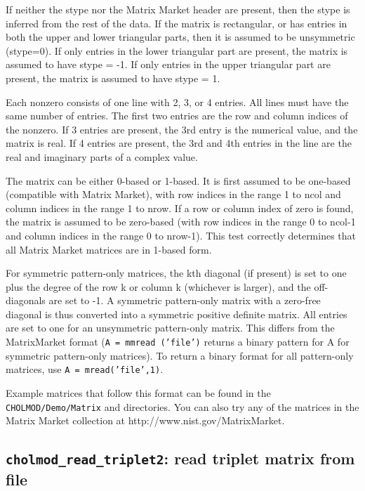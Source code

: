 \documentclass[11pt]{article}
\begin{document}
If neither the stype nor the Matrix Market header are present, then the stype
is inferred from the rest of the data.  If the matrix is rectangular, or has
entries in both the upper and lower triangular parts, then it is assumed to be
unsymmetric (stype=0).  If only entries in the lower triangular part are
present, the matrix is assumed to have stype = -1.  If only entries in the
upper triangular part are present, the matrix is assumed to have stype = 1.

Each nonzero consists of one line with 2, 3, or 4 entries.  All lines must have
the same number of entries.  The first two entries are the row and column
indices of the nonzero.  If 3 entries are present, the 3rd entry is the
numerical value, and the matrix is real.  If 4 entries are present, the 3rd and
4th entries in the line are the real and imaginary parts of a complex value.

The matrix can be either 0-based or 1-based.  It is first assumed to be
one-based (compatible with Matrix Market), with row indices in the range 1 to
ncol and column indices in the range 1 to nrow.  If a row or column index of
zero is found, the matrix is assumed to be zero-based (with row indices in the
range 0 to ncol-1 and column indices in the range 0 to nrow-1).  This test
correctly determines that all Matrix Market matrices are in 1-based form.

For symmetric pattern-only matrices, the kth diagonal (if present) is set to
one plus the degree of the row k or column k (whichever is larger), and the
off-diagonals are set to -1.  A symmetric pattern-only matrix with a zero-free
diagonal is thus converted into a symmetric positive definite matrix.  All
entries are set to one for an unsymmetric pattern-only matrix.  This differs
from the MatrixMarket format ({\tt A = mmread ('file')} returns a binary
pattern for A for symmetric pattern-only matrices).  To return a binary format
for all pattern-only matrices, use {\tt A = mread('file',1)}.

Example matrices that follow this format can be found in the {\tt
CHOLMOD/Demo/Matrix} and  directories.  You
can also try any of the matrices in the Matrix Market collection at
http://www.nist.gov/MatrixMarket.

\subsection{{\tt cholmod\_read\_triplet2}: read triplet matrix from file}
\end{document}
